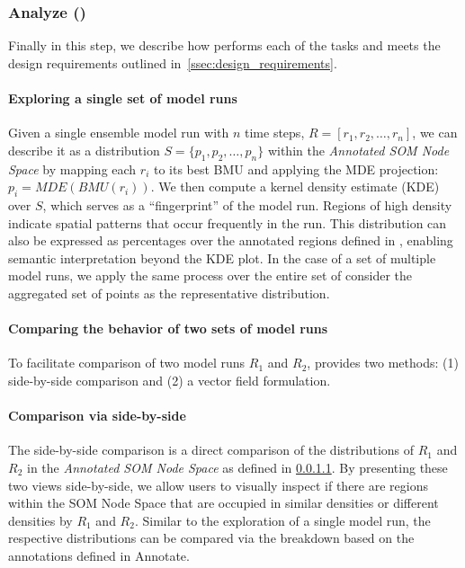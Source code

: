 \vspace{-3pt}
\subsubsection{Analyze ()}
Finally in this step, we describe how \ClimateSOM performs each of the tasks and meets the design requirements outlined in~\cref{ssec:design_requirements}.
\paragraph{Exploring a single set of model runs }\label{ssec:explore}
Given a single ensemble model run with $n$ time steps, $R=[r_1, r_2,\ldots, r_n]$, we can describe it as a distribution $S=\{p_1,p_2,\ldots, p_n\}$ within the \textit{Annotated SOM Node Space} by mapping each $r_i$ to its best BMU and applying the MDE projection: $p_i = MDE(BMU(r_i))$.
We then compute a kernel density estimate (KDE) over $S$, which serves as a “fingerprint” of the model run. Regions of high density indicate spatial patterns that occur frequently in the run. This distribution can also be expressed as percentages over the annotated regions defined in , enabling semantic interpretation beyond the KDE plot.
%
In the case of a set of multiple model runs, we apply the same process over the entire set of consider the aggregated set of points as the representative distribution.
\paragraph{Comparing the behavior of two sets of model runs }
To facilitate comparison of two model runs $R_1$ and $R_2$, \ClimateSOM provides two methods: (1) side-by-side comparison and (2) a vector field formulation.
%
\paragraph{Comparison via side-by-side}
The side-by-side comparison is a direct comparison of the distributions of $R_1$ and $R_2$ in the \textit{Annotated SOM Node Space} as defined in \cref{ssec:explore}.
%
By presenting these two views side-by-side, we allow users to visually inspect if there are regions within the SOM Node Space that are occupied in similar densities or different densities by $R_1$ and $R_2$.
%
Similar to the exploration of a single model run, the respective distributions can be compared via the breakdown based on the annotations defined in  Annotate. 

